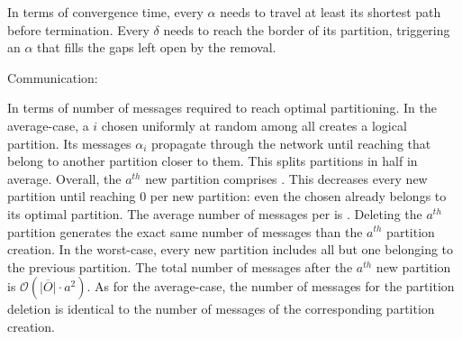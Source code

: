 \begin{asparadesc}
\noindent In terms of convergence time, every $\alpha$ needs to travel
at least its shortest path before termination. Every $\delta$ needs to
reach the border of its partition, triggering an $\alpha$ that fills
the gaps left open by the removal. 

\item[Communication:]
  
In terms of number of messages required to reach optimal
partitioning. In the average-case, a \process $i$ chosen uniformly at
random among all \processes creates a logical partition. Its messages
$\alpha_i$ propagate through the network until reaching \processes
that belong to another partition closer to them. This splits
partitions in half in average. Overall, the $a^{th}$ new partition
comprises  \processes. This decreases every new partition
until reaching $0$ \processes per new partition: even the chosen
\process already belongs to its optimal partition. The average number
of messages per \process is
.  Deleting the
$a^{th}$ partition generates the exact same number of messages than
the $a^{th}$ partition creation.  In the
worst-case, every new partition includes all but one \process
belonging to the previous partition. The total number of messages
after the $a^{th}$ new partition is $\mathcal{O}(\overline{|O|}\cdot
a^2)$. As for the average-case, the number of messages for the
partition deletion is identical to the number of messages of the
corresponding partition creation.

\noindent {}

\end{asparadesc}

